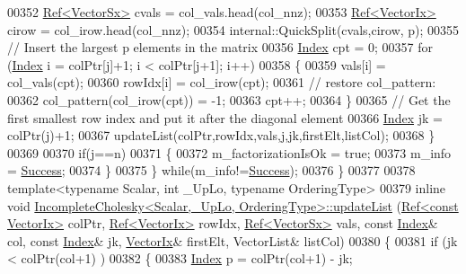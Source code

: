 \begin{DoxyCode}
00352       \hyperlink{group___core___module_class_eigen_1_1_ref}{Ref<VectorSx>} cvals = col\_vals.head(col\_nnz);
00353       \hyperlink{group___core___module_class_eigen_1_1_ref}{Ref<VectorIx>} cirow = col\_irow.head(col\_nnz);
00354       internal::QuickSplit(cvals,cirow, p);
00355       \textcolor{comment}{// Insert the largest p elements in the matrix}
00356       \hyperlink{namespace_eigen_a62e77e0933482dafde8fe197d9a2cfde}{Index} cpt = 0;
00357       \textcolor{keywordflow}{for} (\hyperlink{namespace_eigen_a62e77e0933482dafde8fe197d9a2cfde}{Index} i = colPtr[j]+1; i < colPtr[j+1]; i++)
00358       \{
00359         vals[i] = col\_vals(cpt);
00360         rowIdx[i] = col\_irow(cpt);
00361         \textcolor{comment}{// restore col\_pattern:}
00362         col\_pattern(col\_irow(cpt)) = -1;
00363         cpt++;
00364       \}
00365       \textcolor{comment}{// Get the first smallest row index and put it after the diagonal element}
00366       \hyperlink{namespace_eigen_a62e77e0933482dafde8fe197d9a2cfde}{Index} jk = colPtr(j)+1;
00367       updateList(colPtr,rowIdx,vals,j,jk,firstElt,listCol);
00368     \}
00369 
00370     \textcolor{keywordflow}{if}(j==n)
00371     \{
00372       m\_factorizationIsOk = \textcolor{keyword}{true};
00373       m\_info = \hyperlink{group__enums_gga85fad7b87587764e5cf6b513a9e0ee5ea52581b035f4b59c203b8ff999ef5fcea}{Success};
00374     \}
00375   \} \textcolor{keywordflow}{while}(m\_info!=\hyperlink{group__enums_gga85fad7b87587764e5cf6b513a9e0ee5ea52581b035f4b59c203b8ff999ef5fcea}{Success});
00376 \}
00377 
00378 \textcolor{keyword}{template}<\textcolor{keyword}{typename} Scalar, \textcolor{keywordtype}{int} \_UpLo, \textcolor{keyword}{typename} OrderingType>
00379 \textcolor{keyword}{inline} \textcolor{keywordtype}{void} \hyperlink{class_eigen_1_1_incomplete_cholesky}{IncompleteCholesky<Scalar,\_UpLo, OrderingType>::updateList}
      (\hyperlink{group___core___module_class_eigen_1_1_ref}{Ref<const VectorIx>} colPtr, \hyperlink{group___core___module_class_eigen_1_1_ref}{Ref<VectorIx>} rowIdx, 
      \hyperlink{group___core___module_class_eigen_1_1_ref}{Ref<VectorSx>} vals, \textcolor{keyword}{const} \hyperlink{namespace_eigen_a62e77e0933482dafde8fe197d9a2cfde}{Index}& col, \textcolor{keyword}{const} \hyperlink{namespace_eigen_a62e77e0933482dafde8fe197d9a2cfde}{Index}& jk, 
      \hyperlink{group___core___module}{VectorIx}& firstElt, VectorList& listCol)
00380 \{
00381   \textcolor{keywordflow}{if} (jk < colPtr(col+1) )
00382   \{
00383     \hyperlink{namespace_eigen_a62e77e0933482dafde8fe197d9a2cfde}{Index} p = colPtr(col+1) - jk;

\end{DoxyCode}
